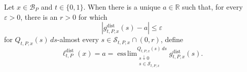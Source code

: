 Let \(x\in\mathcal B_P\) and \(t\in\{0,1\}\).  When there is a unique
\(a\in\mathbb R\) such that, for every \(\varepsilon>0\), there is an
\(r>0\) for which
\[
 \left|g^{\mathrm{dist}}_{t,P,x}(s)-a\right|\leq\varepsilon
\]
for \(Q_{t,P,x}(s)\,ds\)-almost every
\(s\in\mathcal S_{t,P,x}\cap(0,r)\), define
\[
 \ell^{\mathrm{dist}}_{t,P}(x)=a
 =\mathop{\operatorname{ess\,lim}}_{\substack{s\downarrow0\\
 s\in\mathcal S_{t,P,x}}}^{Q_{t,P,x}(s)\,ds}
 g^{\mathrm{dist}}_{t,P,x}(s).
\]